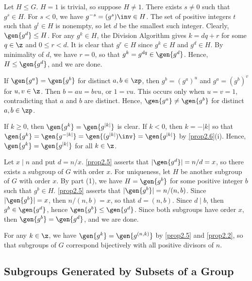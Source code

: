 \begin{proofnum}
    \item Let $H \leq G$. $H = 1$ is trivial, so suppose $H \neq 1$. There exists $s \neq 0$ such that $g^s \in H$. For $s < 0$, we have $g^{-s} = (g^s)\inv \in H$. The set of positive integers $t$ such that $g^t \in H$ is nonempty, so let $d$ be the smallest such integer. Clearly, $\gen{g^d} \leq H$. For any $g^k \in H$, the Division Algorithm gives $k = dq + r$ for some $q \in \z$ and $0 \leq r < d$. It is clear that $g^r \in H$ since $g^k \in H$ and $g^d \in H$. By minimality of $d$, we have $r = 0$, so that $g^k = g^{dq} \in \gen{g^d}$. Hence, $H \leq \gen{g^d}$, and we are done.
    \item If $\gen{g^a} = \gen{g^b}$ for distinct $a, b \in \zp$, then $g^b = (g^a)^u$ and $g^a = (g^b)^v$ for $u, v \in \z$. Then $b = au = bvu$, or $1 = vu$. This occurs only when $u = v = 1$, contradicting that $a$ and $b$ are distinct. Hence, $\gen{g^a} \neq \gen{g^b}$ for distinct $a, b \in \zp$.
    
    If $k \geq 0$, then $\gen{g^k} = \gen{g^{|k|}}$ is clear. If $k < 0$, then $k = -|k|$ so that $\gen{g^k} = \gen{g^{- |k|}} = \gen{(g^{|k|})\inv} = \gen{g^{|k|}}$ by \autoref{prop2.6}(i). Hence, $\gen{g^k} = \gen{g^{|k|}}$ for all $k \in \z$.
    \item Let $x \mid n$ and put $d = n/x$. \autoref{prop2.5} asserts that $|\gen{g^d}| = n/d = x$, so there exists a subgroup of $G$ with order $x$. For uniqueness, let $H$ be another subgroup of $G$ with order $x$. By part (1), we have $H = \gen{g^b}$ for some positive integer $b$ such that $g^b \in H$. \autoref{prop2.5} asserts that $|\gen{g^b}| = n/(n, b)$. Since $|\gen{g^b}| = x$, then $n/(n, b) = x$, so that $d = (n, b)$. Since $d \mid b$, then $g^b \in \gen{g^d}$, hence $\gen{g^b} \leq \gen{g^d}$. Since both subgroups have order $x$, then $\gen{g^b} = \gen{g^d}$, and we are done.
    
    For any $k \in \z$, we have $\gen{g^k} = \gen{g^{(n, k)}}$ by \autoref{prop2.5} and \autoref{prop2.2}, so that subgroups of $G$ correspond bijectively with all positive divisors of $n$.
\end{proofnum}

\newpage

\subsection{Subgroups Generated by Subsets of a Group} \label{sec2.4}

